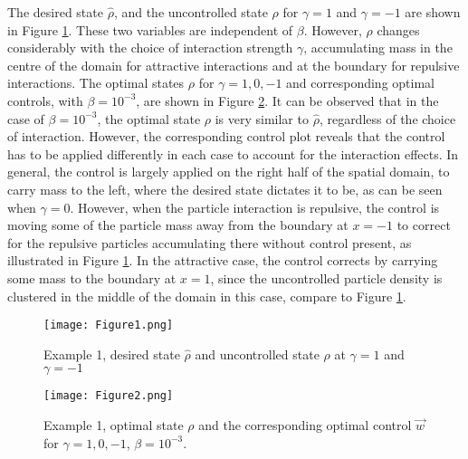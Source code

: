  The desired state $\widehat \rho$, and the uncontrolled state $\rho$ for $\gamma =1$ and $\gamma = -1$ are shown in Figure \ref{Ex12DN1}. These two variables are independent of $\beta$. However, $\rho$ changes considerably with the choice of interaction strength $\gamma$, accumulating mass in the centre of the domain for attractive interactions and at the boundary for repulsive interactions. The optimal states $\rho$ for $\gamma = 1,0,-1$ and corresponding optimal controls, with $\beta = 10^{-3}$, are shown in Figure \ref{Ex12DN2}. 
It can be observed that in the case of $\beta = 10^{-3}$, the optimal state $\rho$ is very similar to $\hat \rho$, regardless of the choice of interaction. However, the corresponding control plot reveals that the control has to be applied differently in each case to account for the interaction effects. In general, the control is largely applied on the right half of the spatial domain, to carry mass to the left, where the desired state dictates it to be, as can be seen when $\gamma = 0$. However, when the particle interaction is repulsive, the control is moving some of the particle mass away from the boundary at $x=-1$ to correct for the repulsive particles accumulating there without control present, as illustrated in Figure \ref{Ex12DN1}. In the attractive case, the control corrects by carrying some mass to the boundary at $x=1$, since the uncontrolled particle density is clustered in the middle of the domain in this case, compare to Figure \ref{Ex12DN1}.
\begin{figure}[h]
	\texttt{[image: Figure1.png]}
	\caption{Example 1, desired state $\widehat \rho$ and uncontrolled state $\rho$ at $\gamma =1$ and $\gamma =-1$}
	\label{Ex12DN1}
\end{figure}
\begin{figure}[h]
	\texttt{[image: Figure2.png]}
	\caption{Example 1, optimal state $\rho$ and the corresponding optimal control $\vec{w}$ for $\gamma = 1,0,-1$, $\beta = 10^{-3}$.}
	\label{Ex12DN2}
\end{figure}

